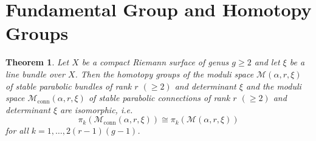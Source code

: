 \documentclass[11pt, reqno]{amsart}
\numberwithin{equation}{section}
\newtheorem{theorem}{Theorem}[section]
\theoremstyle{definition}
\begin{document}
	\section{Fundamental Group and Homotopy Groups}
	\begin{theorem}\label{main}
		Let $X$ be a compact Riemann surface of genus $g \geq 2$ and let $\xi$ be a line bundle over $X$. Then the homotopy groups of the moduli space $\mathcal{M}(\alpha, r,\xi)$ of stable parabolic bundles of rank $r$ $(\geq 2)$ and determinant $\xi$ and the moduli space $\mathcal{M}_{\mathrm{conn}}(\alpha, r,\xi)$ of stable parabolic connections of rank $r$ $(\geq 2)$ and determinant $\xi$ are isomorphic, i.e.
  \[
  \pi_k(\mathcal{M}_{\mathrm{conn}}(\alpha, r, \xi)) \cong \pi_k(\mathcal{M}(\alpha, r, \xi))
  \]
  for all $k=1,\dots, 2(r-1)(g-1)$.
	\end{theorem}
\end{document}
